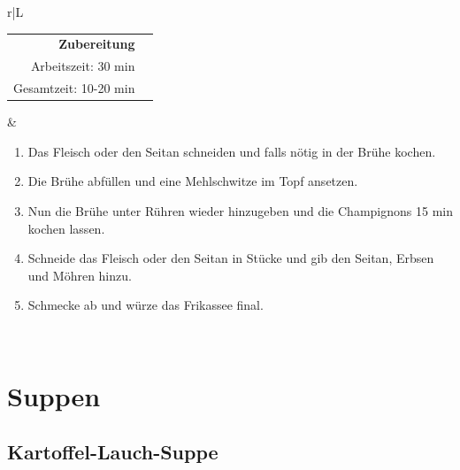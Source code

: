 \documentclass[a4paper, 12pt]{scrbook} 								%
\numberwithin{equation}{section} 									%
\begin{document}
	\newpage
	\begin{tabularx}{\textwidth}{r|L}

		\begin{tabular}[t]{rr}
			\textbf{Zubereitung}	\\
			Arbeitszeit: 30 min	\\
			Gesamtzeit:	10-20 min	\\
		\end{tabular}			&	\begin{enumerate}[]
										\item Das Fleisch oder den Seitan schneiden und falls nötig in der Brühe kochen. 
										\item Die Brühe abfüllen und eine Mehlschwitze im Topf ansetzen.
										\item Nun die Brühe unter Rühren wieder hinzugeben und die Champignons 15 min kochen lassen.
										\item Schneide das Fleisch oder den Seitan in Stücke und gib den Seitan, Erbsen und Möhren hinzu.
										\item Schmecke ab und würze das Frikassee final.
									\end{enumerate}	\\
	\end{tabularx}
	\newpage


	\section{Suppen}
	\newpage


		\subsection{Kartoffel-Lauch-Suppe}
\end{document}
